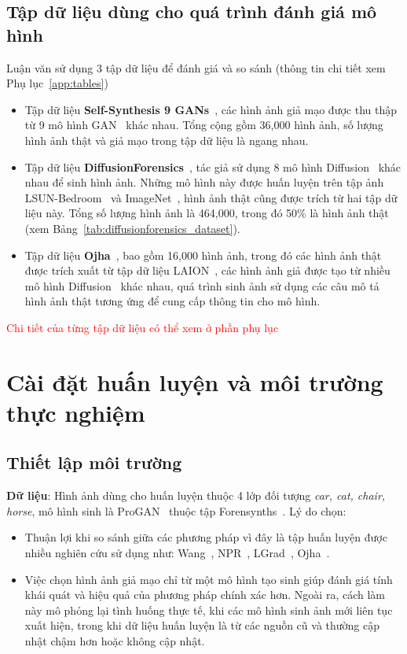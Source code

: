 \subsection{Tập dữ liệu dùng cho quá trình đánh giá mô hình}
Luận văn sử dụng 3 tập dữ liệu để đánh giá và so sánh (thông tin chi tiết xem Phụ lục~\ref{app:tables})
\begin{itemize}
	\item Tập dữ liệu \textbf{Self-Synthesis 9 GANs}~\cite{Tan2023RethinkingTU}, các hình ảnh giả mạo được thu thập từ 9 mô hình GAN~\cite{Goodfellow2014GenerativeAN} khác nhau. Tổng cộng gồm 36,000 hình ảnh, số lượng hình ảnh thật và giả mạo trong tập dữ liệu là ngang nhau.
	\item Tập dữ liệu \textbf{DiffusionForensics}~\cite{Wang2023DIREFD}, tác giả sử dụng 8 mô hình Diffusion~\cite{Ho2020DenoisingDP} khác nhau để sinh hình ảnh. Những mô hình này được huấn luyện trên tập ảnh LSUN-Bedroom~\cite{Yu2015LSUNCO} và ImageNet~\cite{5206848}, hình ảnh thật cũng được trích từ hai tập dữ liệu này. Tổng số lượng hình ảnh là 464,000, trong đó 50\% là hình ảnh thật (xem Bảng~\ref{tab:diffusionforensics_dataset}).
	\item Tập dữ liệu \textbf{Ojha}~\cite{Ojha2023TowardsUF}, bao gồm 16,000 hình ảnh, trong đó các hình ảnh thật được trích xuất từ tập dữ liệu LAION~\cite{abs-2111-02114}, các hình ảnh giả được tạo từ nhiều mô hình Diffusion~\cite{Ho2020DenoisingDP} khác nhau, quá trình sinh ảnh sử dụng các câu mô tả hình ảnh thật tương ứng để cung cấp thông tin cho mô hình.
\end{itemize}

\textcolor{red}{Chi tiết của từng tập dữ liệu có thể xem ở phần phụ lục}

\section{Cài đặt huấn luyện và môi trường thực nghiệm}

\subsection{Thiết lập môi trường}

\textbf{Dữ liệu}: Hình ảnh dùng cho huấn luyện thuộc 4 lớp đối tượng \textit{car, cat, chair, horse}, mô hình sinh là ProGAN~\cite{karras2018progressive} thuộc tập Forensynths~\cite{Wang2019CNNGeneratedIA}. Lý do chọn:
\begin{itemize}
	\item Thuận lợi khi so sánh giữa các phương pháp vì đây là tập huấn luyện được nhiều nghiên cứu sử dụng như: Wang~\cite{Wang2019CNNGeneratedIA}, NPR~\cite{Tan2023RethinkingTU}, LGrad~\cite{Tan2023LearningOG}, Ojha~\cite{Ojha2023TowardsUF}. 
	\item Việc chọn hình ảnh giả mạo chỉ từ một mô hình tạo sinh giúp đánh giá tính khái quát và hiệu quả của phương pháp chính xác hơn. Ngoài ra, cách làm này mô phỏng lại tình huống thực tế, khi các mô hình sinh ảnh mới liên tục xuất hiện, trong khi dữ liệu huấn luyện là từ các nguồn cũ và thường cập nhật chậm hơn hoặc không cập nhật.
\end{itemize}

